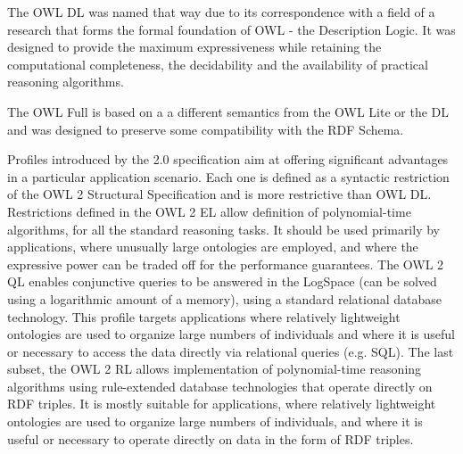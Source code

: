 The OWL DL was named that way due to its correspondence with a field of a research that forms the formal foundation of OWL - the Description Logic. It was designed to provide the maximum expressiveness while retaining the computational completeness, the decidability and the availability of practical reasoning algorithms.

The OWL Full is based on a a different semantics from the OWL Lite or the DL and was designed to preserve some compatibility with the RDF Schema.

Profiles introduced by the 2.0 specification aim at offering significant advantages in a particular application scenario. Each one is defined as a syntactic restriction of the OWL 2 Structural Specification and is more restrictive than OWL DL. Restrictions defined in the OWL 2 EL allow definition of polynomial-time algorithms, for all the standard reasoning tasks. It should be used primarily by applications, where unusually large ontologies are employed, and where the expressive power can be traded off for the performance guarantees. The OWL 2 QL enables conjunctive queries to be answered in the LogSpace (can be solved using a logarithmic amount of a memory), using a standard relational database technology. This profile targets applications where relatively lightweight ontologies are used to organize large numbers of individuals and where it is useful or necessary to access the data directly via relational queries (e.g. SQL). The last subset, the OWL 2 RL allows implementation of polynomial-time reasoning algorithms using rule-extended database technologies that operate directly on RDF triples. It is mostly suitable for applications, where relatively lightweight ontologies are used to organize large numbers of individuals, and where it is useful or necessary to operate directly on data in the form of RDF triples.